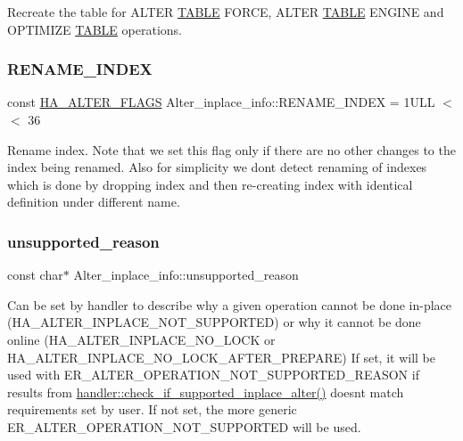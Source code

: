 Recreate the table for A\+L\+T\+ER \mbox{\hyperlink{structTABLE}{T\+A\+B\+LE}} F\+O\+R\+CE, A\+L\+T\+ER \mbox{\hyperlink{structTABLE}{T\+A\+B\+LE}} E\+N\+G\+I\+NE and O\+P\+T\+I\+M\+I\+ZE \mbox{\hyperlink{structTABLE}{T\+A\+B\+LE}} operations. \mbox{\label{classAlter__inplace__info_ac6e4d8e123abd811e1bc0fed6de44baf}} 
\subsubsection{\texorpdfstring{R\+E\+N\+A\+M\+E\+\_\+\+I\+N\+D\+EX}{RENAME\_INDEX}}
{\footnotesize\ttfamily const \mbox{\hyperlink{classAlter__inplace__info_a45258f36b4942b5cabee7239463daaca}{H\+A\+\_\+\+A\+L\+T\+E\+R\+\_\+\+F\+L\+A\+GS}} Alter\+\_\+inplace\+\_\+info\+::\+R\+E\+N\+A\+M\+E\+\_\+\+I\+N\+D\+EX = 1\+U\+L\+L $<$$<$ 36\hspace{0.3cm}{\ttfamily [static]}}

Rename index. Note that we set this flag only if there are no other changes to the index being renamed. Also for simplicity we don\textquotesingle{}t detect renaming of indexes which is done by dropping index and then re-\/creating index with identical definition under different name. \mbox{\label{classAlter__inplace__info_a13eca57ab999f94ec5bf6b3c242cbb17}} 
\subsubsection{\texorpdfstring{unsupported\+\_\+reason}{unsupported\_reason}}
{\footnotesize\ttfamily const char$\ast$ Alter\+\_\+inplace\+\_\+info\+::unsupported\+\_\+reason}

Can be set by handler to describe why a given operation cannot be done in-\/place (H\+A\+\_\+\+A\+L\+T\+E\+R\+\_\+\+I\+N\+P\+L\+A\+C\+E\+\_\+\+N\+O\+T\+\_\+\+S\+U\+P\+P\+O\+R\+T\+ED) or why it cannot be done online (H\+A\+\_\+\+A\+L\+T\+E\+R\+\_\+\+I\+N\+P\+L\+A\+C\+E\+\_\+\+N\+O\+\_\+\+L\+O\+CK or H\+A\+\_\+\+A\+L\+T\+E\+R\+\_\+\+I\+N\+P\+L\+A\+C\+E\+\_\+\+N\+O\+\_\+\+L\+O\+C\+K\+\_\+\+A\+F\+T\+E\+R\+\_\+\+P\+R\+E\+P\+A\+RE) If set, it will be used with E\+R\+\_\+\+A\+L\+T\+E\+R\+\_\+\+O\+P\+E\+R\+A\+T\+I\+O\+N\+\_\+\+N\+O\+T\+\_\+\+S\+U\+P\+P\+O\+R\+T\+E\+D\+\_\+\+R\+E\+A\+S\+ON if results from \mbox{\hyperlink{classhandler_a67890a9deb89b9ef0128601e7687fcba}{handler\+::check\+\_\+if\+\_\+supported\+\_\+inplace\+\_\+alter()}} doesn\textquotesingle{}t match requirements set by user. If not set, the more generic E\+R\+\_\+\+A\+L\+T\+E\+R\+\_\+\+O\+P\+E\+R\+A\+T\+I\+O\+N\+\_\+\+N\+O\+T\+\_\+\+S\+U\+P\+P\+O\+R\+T\+ED will be used.

